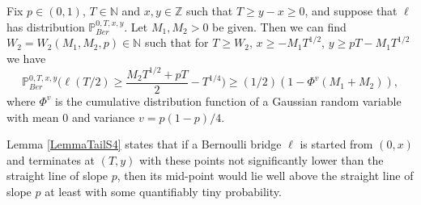 \begin{lemma}\label{LemmaTailS4}Fix $p \in (0,1)$, $T \in \mathbb{N}$ and $x, y\in \mathbb{Z}$ such that $T \geq y-x \geq 0$, and suppose that $\ell$ has distribution $\mathbb{P}^{0,T,x,y}_{Ber}$. Let $M_1,M_2 > 0$ be given. Then we can find $W_2 = W_2(M_1,M_2,p) \in \mathbb{N}$ such that for $T \geq W_2$, $ x \geq -M_1T^{1/2}$, $ y \geq pT -  M_1T^{1/2}$ we have
\begin{equation}\label{halfEq2S4}
\mathbb{P}^{0,T,x,y}_{Ber}\bigg( \ell( T/2 )  \geq \frac{M_2T^{1/2} + p T}{2} - T^{1/4} \bigg) \geq (1/2) (1 - \Phi^{v}(M_1 + M_2) ),
\end{equation}
where $\Phi^{v}$ is the cumulative distribution function  of a Gaussian random variable with mean $0$ and variance $v = p(1-p)/4$.
\end{lemma}
\begin{remark} Lemma \ref{LemmaTailS4} states that  if a Bernoulli bridge $\ell$ is started from $(0,x)$ and terminates at $(T,y)$ with these points not significantly lower than the straight line of slope $p$, then its mid-point would lie well above the straight line of slope $p$ at least with some quantifiably tiny probability.
\end{remark}

